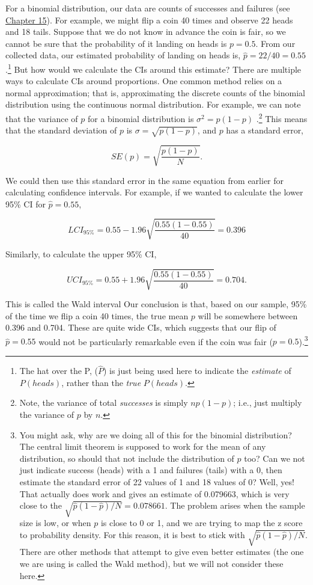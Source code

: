 \documentclass[
]{scrbook}
\begin{document}
For a binomial distribution, our data are counts of successes and failures (see \protect\hyperlink{Chapter_15}{Chapter 15}).
For example, we might flip a coin 40 times and observe 22 heads and 18 tails.
Suppose that we do not know in advance the coin is fair, so we cannot be sure that the probability of it landing on heads is \(p = 0.5\).
From our collected data, our estimated probability of landing on heads is, \(\hat{p} = 22/40 = 0.55\).\footnote{The hat over the P, (\(\hat{P}\)) is just being used here to indicate the \emph{estimate} of \(P(heads)\), rather than the \emph{true} \(P(heads)\).}
But how would we calculate the CIs around this estimate?
There are multiple ways to calculate CIs around proportions.
One common method relies on a normal approximation; that is, approximating the discrete counts of the binomial distribution using the continuous normal distribution.
For example, we can note that the variance of \(p\) for a binomial distribution is \(\sigma^{2} = p\left(1 - p\right)\) \citep{Box1978, Sokal1995}.\footnote{Note, the variance of total \emph{successes} is simply \(np\left(1 - p\right)\); i.e., just multiply the variance of \(p\) by \(n\).}
This means that the standard deviation of \(p\) is \(\sigma = \sqrt{p\left(1 - p\right)}\), and \(p\) has a standard error,

\[SE(p) = \sqrt{\frac{p\left(1 - p\right)}{N}}.\]

We could then use this standard error in the same equation from earlier for calculating confidence intervals.
For example, if we wanted to calculate the lower 95\% CI for \(\hat{p} = 0.55\),

\[LCI_{95\%} = 0.55 - 1.96 \sqrt{\frac{0.55\left(1 - 0.55\right)}{40}} = 0.396\]

Similarly, to calculate the upper 95\% CI,

\[UCI_{95\%} = 0.55 + 1.96 \sqrt{\frac{0.55\left(1 - 0.55\right)}{40}} = 0.704.\]

This is called the Wald interval
Our conclusion is that, based on our sample, 95\% of the time we flip a coin 40 times, the true mean \(p\) will be somewhere between 0.396 and 0.704.
These are quite wide CIs, which suggests that our flip of \(\hat{p} = 0.55\) would not be particularly remarkable even if the coin was fair (\(p = 0.5\)).\footnote{You might ask, why are we doing all of this for the binomial distribution? The central limit theorem is supposed to work for the mean of any distribution, so should that not include the distribution of \(p\) too? Can we not just indicate success (heads) with a 1 and failures (tails) with a 0, then estimate the standard error of 22 values of 1 and 18 values of 0? Well, yes! That actually does work and gives an estimate of 0.079663, which is very close to the \(\sqrt{\hat{p}(1-\hat{p})/N} = 0.078661\). The problem arises when the sample size is low, or when \(p\) is close to 0 or 1, and we are trying to map the z score to probability density. For this reason, it is best to stick with \(\sqrt{\hat{p}(1-\hat{p})/N}\). There are other methods that attempt to give even better estimates (the one we are using is called the Wald method), but we will not consider these here.}
\end{document}

